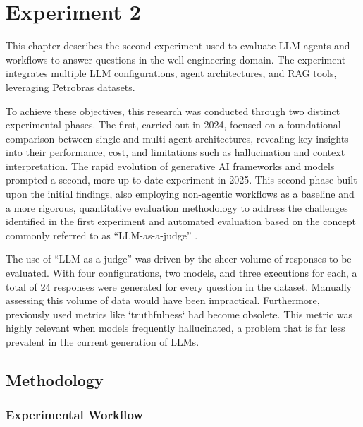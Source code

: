 \chapter{Experiment 2}



    
    This chapter describes the second experiment used to evaluate LLM agents and workflows to answer questions in the well engineering domain. 
    The experiment integrates multiple LLM configurations, agent architectures, and RAG tools, leveraging Petrobras datasets.

    To achieve these objectives, this research was conducted through two distinct experimental phases. The first, carried out in 2024, focused on a foundational comparison between single and multi-agent architectures, revealing key insights into their performance, cost, and limitations such as hallucination and context interpretation. 
    The rapid evolution of generative AI frameworks and models prompted a second, more up-to-date experiment in 2025. 
    This second phase built upon the initial findings, also employing non-agentic workflows as a baseline and a more rigorous, quantitative evaluation methodology to address the challenges identified in the first experiment and automated evaluation based on the concept commonly referred to as ``LLM-as-a-judge'' \citep{Gu2025}.

    The use of \enquote{LLM-as-a-judge} was driven by the sheer volume of responses to be evaluated. 
    With four configurations, two models, and three executions for each, a total of 24 responses were generated for every question in the dataset.
    Manually assessing this volume of data would have been impractical.
    Furthermore, previously used metrics like `truthfulness` had become obsolete. 
    This metric was highly relevant when models frequently hallucinated, a problem that is far less prevalent in the current generation of LLMs. 

    \section{Methodology}

        \subsection{Experimental Workflow}

